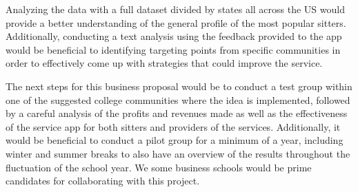 \documentclass[12pt]{article}
\begin{document}
Analyzing the data with a full dataset divided by states all across the
US would provide a better understanding of the general profile of the
most popular sitters. Additionally, conducting a text analysis using the
feedback provided to the app would be beneficial to identifying
targeting points from specific communities in order to effectively come
up with strategies that could improve the service.~

The next steps for this business proposal would be to conduct a test
group within one of the suggested college communities where the idea is
implemented, followed by a careful analysis of the profits and revenues
made as well as the effectiveness of the service app for both sitters
and providers of the services. Additionally, it would be beneficial to
conduct a pilot group for a minimum of a year, including winter and
summer breaks to also have an overview of the results throughout the
fluctuation of the school year. We some business schools would be prime
candidates for collaborating with this project.


\renewcommand\refname{Appendix}

\end{document}
